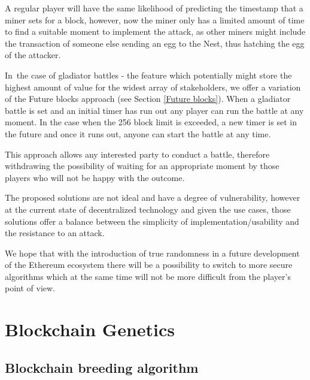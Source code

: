 \documentclass[12pt]{article}
\begin{document}
\begin{justify}
A regular player will have the same likelihood of predicting the timestamp that a miner sets for a block, however, now the miner only has a limited amount of time to find a suitable moment to implement the attack, as other miners might include the transaction of someone else sending an egg to the Nest, thus hatching the egg of the attacker.
\end{justify}\par

In\ the case of gladiator battles - the feature which potentially might store the highest amount of value for the widest array of stakeholders, we offer a variation of the Future blocks approach (see Section  \ref{Future blocks}). When a gladiator battle is set and an initial timer has run out any player can run the battle at any moment. In the case when the 256 block limit is exceeded, a new timer is set in the future and once it runs out, anyone can start the battle at any time.\par

This approach allows any interested party to conduct a battle, therefore withdrawing the possibility of waiting for an appropriate moment by those players who will not be happy with the outcome.\par


\vspace{\baselineskip}
The proposed solutions are not ideal and have a degree of vulnerability, however at the current state of decentralized technology and given the use cases, those solutions offer a balance between the simplicity of implementation/usability and the resistance to an attack.\par

We hope that with the introduction of true randomness in a future development of the Ethereum ecosystem there will be a possibility to switch to more secure algorithms which at the same time will not be more difficult from the player’s point of view.\par

\newpage
\vspace{\baselineskip}\section{Blockchain Genetics}
\label{Blockchain Genetics}   \par

\subsection{Blockchain breeding algorithm}
  \label{Blockchain breeding algorithm}  \par
\end{document}
